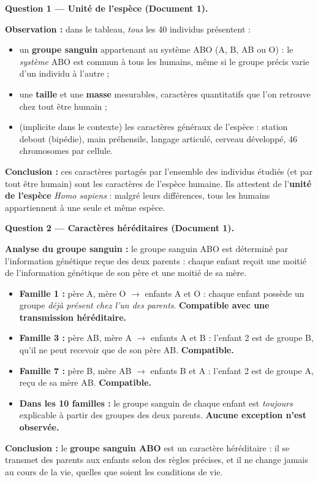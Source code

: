 \documentclass[11pt]{article}
\newcommand{\cle}[1]{{\popxbold\color{popdark}#1}}
\newcounter{popsec}
\newcounter{popsub}
\newcommand{\courssub}[1]{%
  \stepcounter{popsub}%
  \par\vspace{9pt}\noindent{\popxbold\fontsize{11.5}{13}\selectfont\color{popink}{\color{poporange}\thepopsec.\thepopsub}\hspace{6pt}#1}\par\nopagebreak\vspace{4pt}
}
\begin{document}
\courssub{Démarche et corrigé commenté}
\begin{exoresolu}
\textbf{Question 1 — Unité de l'espèce (Document 1).}
\par
\textbf{Observation :} dans le tableau, \emph{tous} les 40 individus présentent :
\begin{itemize}
    \item un \textbf{groupe sanguin} appartenant au système ABO (A, B, AB ou O) : le \emph{système} ABO est commun à tous les humains, même si le groupe précis varie d'un individu à l'autre ;
    \item une \textbf{taille} et une \textbf{masse} mesurables, caractères quantitatifs que l'on retrouve chez tout être humain ;
    \item (implicite dans le contexte) les caractères généraux de l'espèce : station debout (bipédie), main préhensile, langage articulé, cerveau développé, 46 chromosomes par cellule.
\end{itemize}
\textbf{Conclusion :} ces caractères partagés par l'ensemble des individus étudiés (et par tout être humain) sont les \cle{caractères de l'espèce humaine}. Ils attestent de l'\textbf{unité de l'espèce} \emph{Homo sapiens} : malgré leurs différences, tous les humains appartiennent à une seule et même espèce.

\medskip
\textbf{Question 2 — Caractères héréditaires (Document 1).}
\par
\textbf{Analyse du groupe sanguin :} le groupe sanguin ABO est déterminé par l'information génétique reçue des deux parents : chaque enfant reçoit une moitié de l'information génétique de son père et une moitié de sa mère.
\begin{itemize}
    \item \textbf{Famille 1 :} père A, mère O $\to$ enfants A et O : chaque enfant possède un groupe \emph{déjà présent chez l'un des parents}. \textbf{Compatible avec une transmission héréditaire.}
    \item \textbf{Famille 3 :} père AB, mère A $\to$ enfants A et B : l'enfant 2 est de groupe B, qu'il ne peut recevoir que de son père AB. \textbf{Compatible.}
    \item \textbf{Famille 7 :} père B, mère AB $\to$ enfants B et A : l'enfant 2 est de groupe A, reçu de sa mère AB. \textbf{Compatible.}
    \item \textbf{Dans les 10 familles :} le groupe sanguin de chaque enfant est \emph{toujours} explicable à partir des groupes des deux parents. \textbf{Aucune exception n'est observée.}
\end{itemize}
\textbf{Conclusion :} le \textbf{groupe sanguin ABO} est un \cle{caractère héréditaire} : il se transmet des parents aux enfants selon des règles précises, et il ne change jamais au cours de la vie, quelles que soient les conditions de vie.


\end{exoresolu}
\end{document}
